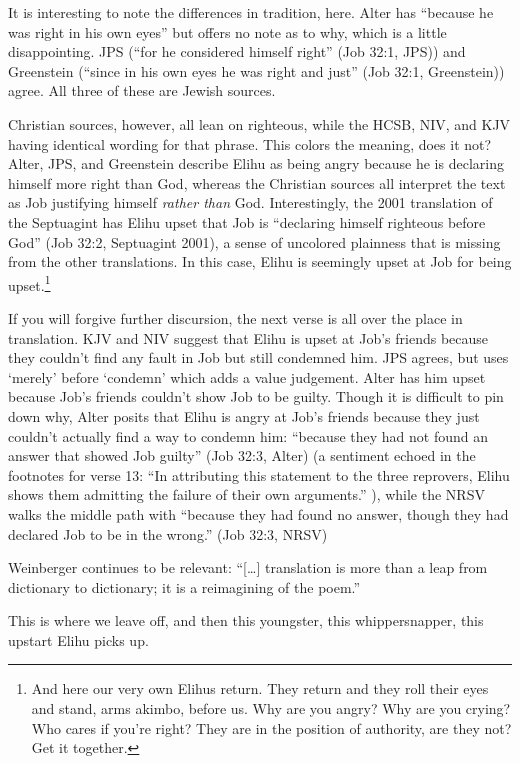 It is interesting to note the differences in tradition, here. Alter has ``because he was right in his own eyes'' but offers no note as to why, which is a little disappointing. JPS (``for he considered himself right'' (Job 32:1, JPS)) and Greenstein (``since in his own eyes he was right and just'' (Job 32:1, Greenstein)) agree. All three of these are Jewish sources.

Christian sources, however, all lean on righteous, while the HCSB, NIV, and KJV having identical wording for that phrase. This colors the meaning, does it not? Alter, JPS, and Greenstein describe Elihu as being angry because he is declaring himself more right than God, whereas the Christian sources all interpret the text as Job justifying himself \emph{rather than} God. Interestingly, the 2001 translation of the Septuagint has Elihu upset that Job is ``declaring himself righteous before God'' (Job 32:2, Septuagint 2001\nocite{septuagint}), a sense of uncolored plainness that is missing from the other translations. In this case, Elihu is seemingly upset at Job for being upset.\footnote{And here our very own Elihus return. They return and they roll their eyes and stand, arms akimbo, before us. Why are you angry? Why are you crying? Who cares if you're right? They are in the position of authority, are they not? Get it together.}

If you will forgive further discursion, the next verse is all over the place in translation. KJV and NIV suggest that Elihu is upset at Job's friends because they couldn't find any fault in Job but still condemned him. JPS agrees, but uses `merely' before `condemn' which adds a value judgement. Alter has him upset because Job's friends couldn't show Job to be guilty. Though it is difficult to pin down why, Alter posits that Elihu is angry at Job's friends because they just couldn't actually find a way to condemn him: ``because they had not found an answer that showed Job guilty'' (Job 32:3, Alter) (a sentiment echoed in the footnotes for verse 13: ``In attributing this statement to the three reprovers, Elihu shows them admitting the failure of their own arguments.'' \parencite[548]{alter}), while the NRSV walks the middle path with ``because they had found no answer, though they had declared Job to be in the wrong.'' (Job 32:3, NRSV)

Weinberger continues to be relevant: ``{[}\ldots{]} translation is more than a leap from dictionary to dictionary; it is a reimagining of the poem.'' \parencite[46]{wangwei}

This is where we leave off, and then this youngster, this whippersnapper, this upstart Elihu picks up.

